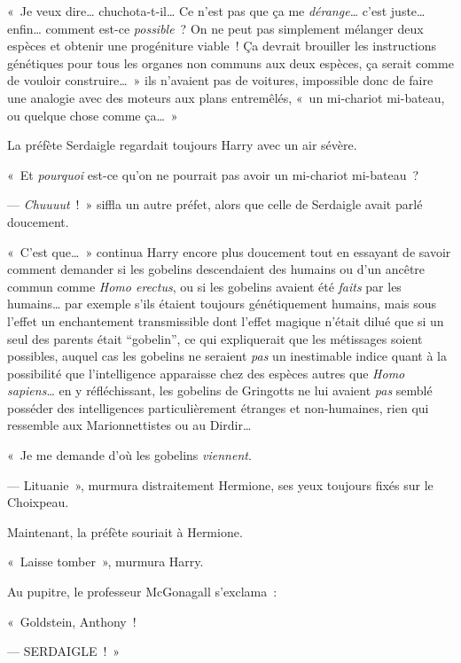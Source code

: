 «~Je veux dire… chuchota-t-il… Ce n'est pas que ça me \emph{dérange…} c'est juste… enfin… comment est-ce \emph{possible}~? On ne peut pas simplement mélanger deux espèces et obtenir une progéniture viable~! Ça devrait brouiller les instructions génétiques pour tous les organes non communs aux deux espèces, ça serait comme de vouloir construire…~» ils n'avaient pas de voitures, impossible donc de faire une analogie avec des moteurs aux plans entremêlés, «~un mi-chariot mi-bateau, ou quelque chose comme ça…~»

La préfète Serdaigle regardait toujours Harry avec un air sévère.

«~Et \emph{pourquoi} est-ce qu'on ne pourrait pas avoir un mi-chariot mi-bateau~?

--- \emph{Chuuuut}~!~» siffla un autre préfet, alors que celle de Serdaigle avait parlé doucement.

«~C'est que…~» continua Harry encore plus doucement tout en essayant de savoir comment demander si les gobelins descendaient des humains ou d'un ancêtre commun comme \emph{Homo erectus}, ou si les gobelins avaient été \emph{faits} par les humains… par exemple s'ils étaient toujours génétiquement humains, mais sous l'effet un enchantement transmissible dont l'effet magique n'était dilué que si un seul des parents était “gobelin”, ce qui expliquerait que les métissages soient possibles, auquel cas les gobelins ne seraient \emph{pas} un inestimable indice quant à la possibilité que l'intelligence apparaisse chez des espèces autres que \emph{Homo sapiens}… en y réfléchissant, les gobelins de Gringotts ne lui avaient \emph{pas} semblé posséder des intelligences particulièrement étranges et non-humaines, rien qui ressemble aux Marionnettistes\footnotemark{} ou au Dirdir\footnotemark{}…

«~Je me demande d'où les gobelins \emph{viennent}.

--- Lituanie~», murmura distraitement Hermione, ses yeux toujours fixés sur le Choixpeau.

Maintenant, la préfète souriait à Hermione.

«~Laisse tomber~», murmura Harry.

Au pupitre, le professeur McGonagall s'exclama~:

«~Goldstein, Anthony~!

--- SERDAIGLE~!~»

